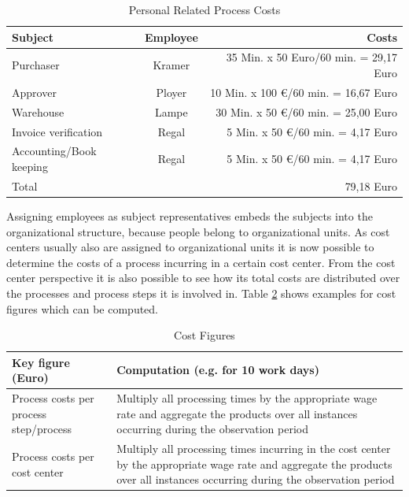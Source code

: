 \begin{table}[htbp]
	\centering
	\begin{tabular}{|p{5.0 cm } |c|r|}
		\hline
		\textbf{Subject} & \textbf{Employee} & \textbf{Costs}\\
		\hline
		\hline
		Purchaser & Kramer & 35 Min. x 50 Euro/60 min.  =  29,17 Euro\\
		\hline
		Approver & Ployer & 10 Min. x 100 €/60 min. =  16,67 Euro\\
		\hline
		Warehouse & Lampe & 30 Min. x 50 €/60 min.  =  25,00 Euro\\
		\hline
		Invoice verification & Regal & 5 Min. x 50 €/60 min.    =    4,17 Euro\\
		\hline
		Accounting/Book keeping & Regal & 5 Min. x 50 €/60 min.    =    4,17 Euro\\
		\hline
		Total & & 79,18 Euro\\
		\hline
	\end{tabular}
\label{tab:ProcessCosts}
\caption{Personal Related Process Costs}
\end{table}

Assigning employees as subject representatives embeds the subjects into the organizational structure, because people belong to organizational units. As cost centers usually also are assigned to organizational units it is now possible to determine the costs of a process incurring in a certain cost center. From the cost center perspective it is also possible to see how its total costs are distributed over the processes and process steps it is involved in. Table \ref{tab:CostFig} shows examples for cost figures which can be computed.

\begin{table}[htbp]
	\centering
	\begin{tabular}{|p{3.0 cm } |p{10.0 cm }|}
		\hline
		\textbf{Key figure (Euro)} & \textbf{Computation (e.g. for 10 work days)}\\
		\hline
		\hline
		Process costs per process step/process & Multiply all processing times by the appropriate wage rate and aggregate the products over all instances occurring during the observation period\\
		\hline
		Process costs per cost center & Multiply all processing times incurring in the cost center by the appropriate wage rate and aggregate the products over all instances occurring during the observation period\\
		\hline
	\end{tabular}
\label{tab:CostFig}
\caption{Cost Figures}
\end{table}

